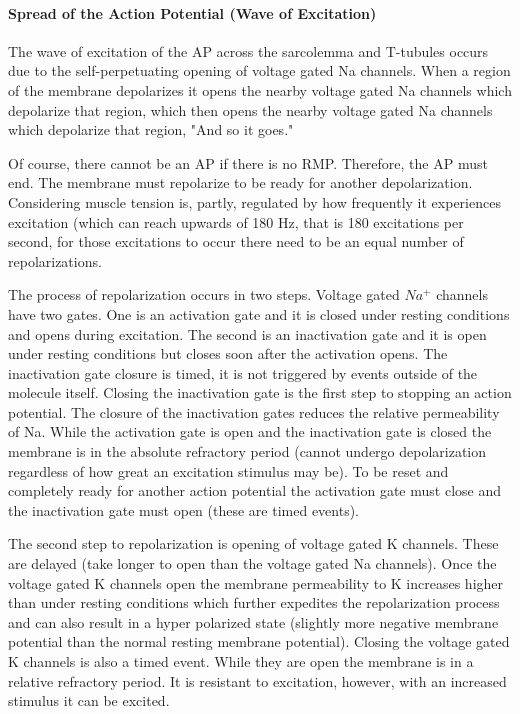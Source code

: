 \paragraph{Spread of the Action Potential (Wave of Excitation)}

The wave of excitation of the AP across the sarcolemma and T-tubules occurs due to the self-perpetuating opening of voltage gated Na channels. When a region of the membrane depolarizes it opens the nearby voltage gated Na channels which depolarize that region, which then opens the nearby voltage gated Na channels which depolarize that region, "And so it goes."\footnotemark{}

Of course, there cannot be an AP if there is no RMP. Therefore, the AP must end. The membrane must repolarize to be ready for another depolarization. Considering muscle tension is, partly, regulated by how frequently it experiences excitation (which can reach upwards of 180 Hz, that is 180 excitations per second, for those excitations to occur there need to be an equal number of repolarizations.

The process of repolarization occurs in two steps. Voltage gated $Na^+$ channels have two gates. One is an activation gate and it is closed under resting conditions and opens during excitation. The second is an inactivation gate and it is open under resting conditions but closes soon after the activation opens. The inactivation gate closure is timed, it is not triggered by events outside of the molecule itself. Closing the inactivation gate is the first step to stopping an action potential. The closure of the inactivation gates reduces the relative permeability of Na. While the activation gate is open and the inactivation gate is closed the membrane is in the absolute refractory period (cannot undergo depolarization regardless of how great an excitation stimulus may be). To be reset and completely ready for another action potential the activation gate must close and the inactivation gate must open (these are timed events).

The second step to repolarization is opening of voltage gated K channels. These are delayed (take longer to open than the voltage gated Na channels). Once the voltage gated K channels open the membrane permeability to K increases higher than under resting conditions which further expedites the repolarization process and can also result in a hyper polarized state (slightly more negative membrane potential than the normal resting membrane potential). Closing the voltage gated K channels is also a timed event. While they are open the membrane is in a relative refractory period. It is resistant to excitation, however, with an increased stimulus it can be excited.

